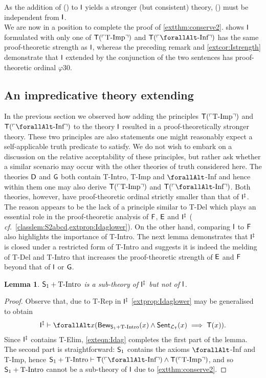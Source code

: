 \documentclass[UKenglish,cleveref,DIV=12]{scrartcl}
\let\forall\forallAlt
\newtheorem{lemma}{Lemma}
\theoremstyle{definition}
\theoremstyle{definition}
\begin{document}
As the addition of (\ddag) to $\mathsf{I}$ yields a stronger (but consistent) theory, (\ddag) must be independent from $\mathsf{I}$.\\

We are now in a position to complete the proof of \cref{extthm:conserve2}.
 shows $\mathsf{I}$ formulated with only one of $\mathsf{T}(\ulcorner{\text{T-Imp}}\urcorner)$ and $\T(\gn{\text{$\forall$-Inf}})$ has the same proof-theoretic strength as $\mathsf{I}$, whereas the preceding remark and \cref{extcor:Istrength} demonstrate that $\mathsf{I}$ extended by the conjunction of the two sentences has proof-theoretic ordinal $\varphi30$.
\subsection{An impredicative theory extending \tI}\label{extsec:S3}\label{extsec:S3consis}
In the previous section we observed how adding the principles
$\mathsf{T}(\ulcorner{\text{T-Imp}}\urcorner)$ and $\T(\gn{\text{$\forall$-Inf}})$ to the theory $\mathsf{I}$
resulted in a proof-theoretically stronger theory. These two principles are also
statements one might reasonably expect a self-applicable truth predicate to
satisfy. We do not wish to embark on a discussion on the relative acceptability
of these principles, but rather ask whether a similar scenario may occur with
the other theories of truth considered
here. The theories $\mathsf{D}$ and $\mathsf{G}$ both contain T-Intro, T-Imp and $\forall$-Inf
and hence within them one may also derive $\mathsf{T}(\ulcorner{\text{T-Imp}}\urcorner)$ and
$\T(\gn{\text{$\forall$-Inf}})$. Both theories, however, have proof-theoretic
ordinal strictly smaller than that of $\mathsf{I}^\ddag$. The reason appears to be the
lack of a principle similar to T-Del which plays an essential role in the
proof-theoretic analysis of $\mathsf{F}$, $\mathsf{E}$ and $\mathsf{I}^\ddag$ ({\em
cf.}~\cref{classlem:S2abcd,extprop:Idaglower}). On the other hand, comparing
$\mathsf{I}$ to $\mathsf{F}$ also highlights the importance of T-Intro. The next lemma
demonstrates that $\mathsf{I}^\ddag$ is closed under a restricted
form of T-Intro and suggests it is indeed the melding of T-Del and T-Intro that
increases the proof-theoretic strength of $\mathsf{E}$ and $\mathsf{F}$ beyond that of $\mathsf{I}$ or
$\mathsf{G}$.
\begin{lemma}\label{extlem:Idag}
  $\mathsf{S}_1+\text{T-Intro}$ is a sub-theory of $\mathsf{I}^\ddag$ but not of $\mathsf{I}$.
\end{lemma}
\begin{proof}
Observe that, due to T-Rep in $\mathsf{I}^\ddag$ \cref{extprop:Idaglower} may be generalised to obtain
\begin{align}\label{exteqn:Idag}
 \I^\ddag\proves\forall x( \Prov_{\theory S_1+\text{T-Intro}}(x)\land\Sent_{\L_\T}(x)\implies \T(x)).
\end{align}
Since $\mathsf{I}^\ddag$ contains T-Elim, \cref{exteqn:Idag} completes the first part of
the lemma. The second part is straightforward: $\mathsf{S}_1$ contains the axioms
$\forall$-Inf and T-Imp, hence $\theory S_1+\text{T-Intro}\proves
\T(\gn{\text{$\forall$-Inf}})\land \T(\gn{\text{T-Imp}})$, and so $\mathsf{S}_1+\text{T-Intro}$ cannot be a sub-theory of $\mathsf{I}$ due to
\cref{extthm:conserve2}.
\end{proof}
\end{document}
